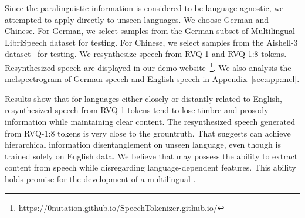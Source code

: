 

% 

Since the paralinguistic information is considered to be language-agnostic, we attempted to apply \method directly to unseen languages. We choose German and Chinese. For German, we select samples from the German subset of Multilingual LibriSpeech dataset for testing. For Chinese, we select samples from the Aishell-3 dataset~\citep{shi2021aishell3} for testing. We resynthesize speech from RVQ-1 and RVQ-1:8 tokens. Resynthesized speech are displayed in our demo website~\footnote{\url{https://0nutation.github.io/SpeechTokenizer.github.io/}}. We also analysis the melspectrogram of German speech and English speech in Appendix~\ref{sec:app:mel}.

Results show that for languages either closely or distantly related to English, resynthesized speech from RVQ-1 tokens tend to lose timbre and prosody information while maintaining clear content. The resynthesized speech generated from RVQ-1:8 tokens is very close to the grountruth. That suggests \method can achieve hierarchical information disentanglement on unseen language, even though \method is trained solely on English data. We believe that \method may possess the ability to extract content from speech while disregarding language-dependent features. This ability holds promise for the development of a multilingual \method.


